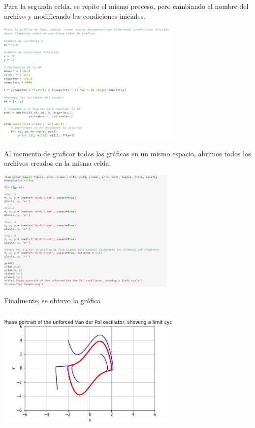 \documentclass{article}
\begin{document}
Para la segunda celda, se repite el mismo proceso, pero cambiando el nombre del archivo y modificando las condiciones iniciales.
    \begin{center}
    \includegraphics[height=6cm]{celda2.png}
    \end{center}
    
Al momento de graficar todas las gráficas en un mismo espacio, abrimos todos los archivos creados en la misma celda.
    \begin{center}
    \includegraphics[height=6cm]{celda3.png}
    \end{center}
    
Finalmente, se obtuvo la gráfica
	\begin{center}
    \includegraphics[height=6cm]{Image1.png}
    \end{center}
\end{document}
